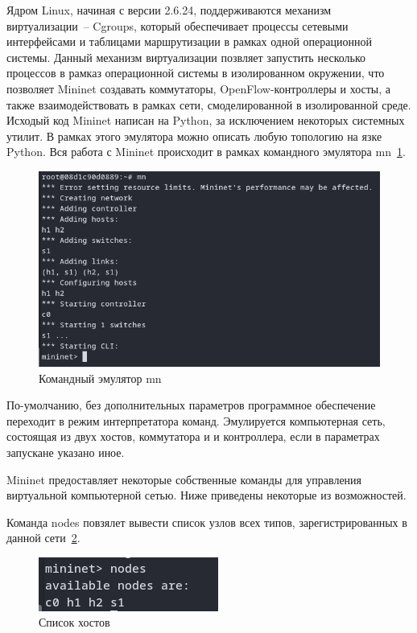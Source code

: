 \documentclass[bachelor, och, coursework]{SCWorks}
\begin{document}
Ядром Linux, начиная с версии 2.6.24, поддерживаются механизм виртуализации~-- Cgroups\cite{cgroups}, который обеспечивает  процессы сетевыми интерфейсами и таблицами маршрутизации в рамках одной операционной системы. 
Данный механизм виртуализации позвляет запустить несколько процессов в рамказ операционной системы в изолированном окружении, что позволяет Mininet создавать коммутаторы, OpenFlow-контроллеры и хосты, а также взаимодействовать в рамках сети, смоделированной в изолированной среде. Исходый код Mininet написан на Python, за исключением некоторых системных утилит. В рамках этого эмулятора можно описать любую топологию на язке Python. Вся работа с Mininet происходит в рамках командного эмулятора mn~\ref{fig:mn}.
\begin{figure}[H]
    \centering
    \includegraphics[width=\textwidth]{mn}
    \caption{Командный эмулятор mn}\label{fig:mn}
\end{figure}

По-умолчанию, без дополнительных параметров программное обеспечение переходит в режим интерпретатора команд. Эмулируется компьютерная сеть, состоящая из двух хостов, коммутатора и и контроллера, если в параметрах запускане указано иное.

Mininet предоставляет некоторые собственные команды  для управления виртуальной компьютерной сетью. Ниже приведены некоторые из возможностей\cite{mininet}.

Команда nodes повзялет вывести список узлов всех типов, зарегистрированных в данной сети~\ref{fig:mn-nodes}.
\begin{figure}[H]
    \centering
    \includegraphics[width=\textwidth]{mn-nodes}
    \caption{Список хостов}\label{fig:mn-nodes}
\end{figure}
\end{document}
